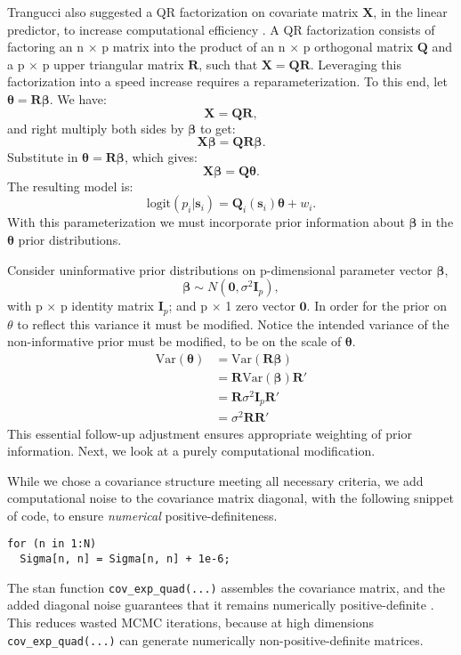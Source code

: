 Trangucci also suggested a QR factorization on covariate matrix $\pmb{X}$, in the linear predictor, to increase computational efficiency \citep{Trangucci}. A QR factorization consists of factoring an n $\times$ p matrix into the product of an n $\times$ p orthogonal matrix $\pmb{Q}$ and a p $\times$ p upper triangular matrix $\pmb{R}$, such that $\pmb{X} = \pmb{QR}$. Leveraging this factorization into a speed increase requires a reparameterization. To this end, let $\pmb{\theta} = \pmb{R \beta}$. We have:
$$ \pmb{X} = \pmb{QR},$$
and right multiply both sides by $\pmb{\beta}$ to get:
$$ \pmb{X \beta} = \pmb{QR \beta}. $$
Substitute in $\pmb{\theta} = \pmb{R \beta}$, which gives:
$$ \pmb{X \beta} = \pmb{Q \theta}. $$
The resulting model is:
\begin{equation} \label{eq:reparam}
\text{logit}(p_{i}|\pmb{s}_{i}) = \pmb{Q}_{i}(\pmb{s}_{i}) \pmb{\theta} + w_{i}.
\end{equation}
With this parameterization we must incorporate prior information about $\pmb{\beta}$ in the $\pmb{\theta}$ prior distributions. 

Consider uninformative prior distributions on p-dimensional parameter vector $\pmb{\beta}$,
\begin{equation}
\pmb{\beta} \sim N(\pmb{0}, \sigma^{2}\pmb{I}_{p}), 
\end{equation}
with p $\times$ p identity matrix $\pmb{I}_{p}$; and p $\times$ 1 zero vector $\pmb{0}$. In order for the prior on $\theta$ to reflect this variance it must be modified. Notice the intended variance of the non-informative prior must be modified, to be on the scale of $\pmb{\theta}$.
\begin{align}
\text{Var}(\pmb{\theta}) &= \text{Var}(\pmb{R \beta}) \\
&= \pmb{R}\text{Var}(\pmb{\beta})\pmb{R}' \\
&= \pmb{R}\sigma^{2}\pmb{I}_{p}\pmb{R}' \\
&= \sigma^{2} \pmb{R}\pmb{R}'
\end{align}
This essential follow-up adjustment ensures appropriate weighting of prior information. Next, we look at a purely computational modification.

While we chose a covariance structure meeting all necessary criteria, we add computational noise to the covariance matrix diagonal, with the following snippet of code, to ensure {\it numerical} positive-definiteness.
\begin{verbatim}
for (n in 1:N)
  Sigma[n, n] = Sigma[n, n] + 1e-6;
\end{verbatim}
The stan function \verb|cov_exp_quad(...)| assembles the covariance matrix, and the added diagonal noise guarantees that it remains numerically positive-definite \citep{Trangucci2017}. This reduces wasted MCMC iterations, because at high dimensions \verb|cov_exp_quad(...)| can generate numerically non-positive-definite matrices.


